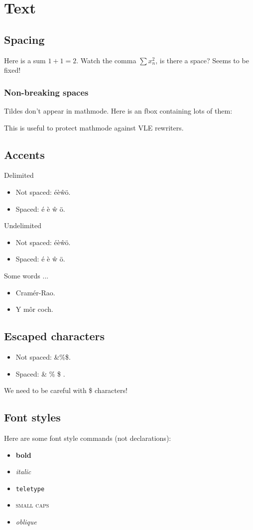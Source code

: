 
\section{Text}

\subsection{Spacing}
Here is a sum $1+1=2$. Watch the comma $\sum x_n^2$, is there a space? Seems to be fixed!

\subsubsection*{Non-breaking spaces}
Tildes don't appear in mathmode. Here is an fbox containing lots of them:
\par
{}
\par
This is useful to protect mathmode against VLE rewriters.


\subsection{Accents}
Delimited
\begin{itemize}
\item Not spaced: \'{e}\`{e}\^{w}\"{o}.
\item Spaced: \'{e} \`{e} \^{w} \"{o}.
\end{itemize}

Undelimited
\begin{itemize}
\item Not spaced: \'e\`e\^w\"o.
\item Spaced: \'e \`e \^w \"o.
\end{itemize}

Some words ...
\begin{itemize}
\item Cram\'{e}r-Rao.
\item Y m\^{o}r coch.
\end{itemize}

\subsection{Escaped characters}
\begin{itemize}
\item Not spaced: \&\%\$.
\item Spaced: \& \% \$ .
\end{itemize}	

We need to be careful with \$ characters!

\subsection{Font styles}
Here are some font style commands (not declarations): 
\begin{itemize}
\item \textbf{bold}
\item \textit{italic}
\item \texttt{teletype}
\item \textsc{small caps} 
\item \textsl{oblique}
\end{itemize}

